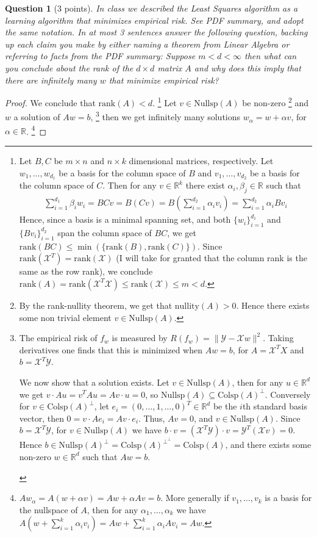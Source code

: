 \documentclass[12pt]{article}
\newcommand{\real}{\mathbb{R}}
\newcommand\set[1]{\{#1\}}
\newcommand\nullity{\text{nullity}}
\newcommand{\norm}[1]{\lVert #1 \rVert}
\newcommand{\X}{\mathcal{X}}
\newcommand{\Y}{\mathcal{Y}}
\newcommand{\colsp}{\text{Colsp}}
\newcommand{\nullsp}{\text{Nullsp}}
\newcommand{\rk}{\text{rank}}
\newtheorem{question}{Question}
\begin{document}
\begin{question}[3 points]
  In class we described the Least Squares algorithm as a learning algorithm that minimizes empirical risk.
  See PDF summary, and adopt the same notation. In at most 3 sentences answer the following question, backing up each claim you make by either naming a theorem from Linear Algebra or referring to facts from the PDF summary: Suppose $m < d < \infty$ then what can you conclude about the rank of the $d \times d$ matrix $A$ and why does this imply that there are infinitely many $w$ that minimize empirical risk? 
\end{question}
\begin{proof}

  We conclude that $\rk(A) < d$.
  \footnote{Let $B, C$ be $m \times n$ and $n \times k$ dimensional matrices, respectively. Let $w_1, \dots, w_{d_1}$ be a basis for the column space of $B$ and $v_1, \dots, v_{d_2}$ be a basis for the column space of $C$. Then for any $v \in \real^k$ there exist $\alpha_i, \beta_j \in \real$ such that
  \begin{align*}
   \sum\limits_{i=1}^{d_1}\beta_iw_i = BCv = B(Cv) =  B(\sum\limits_{i=1}^{d_2}\alpha_iv_i) = \sum\limits_{i=1}^{d_2}\alpha_iBv_i 
  \end{align*}
  Hence, since a basis is a minimal spanning set, and both $\set{w_i}_{i=1}^{d_1}$ and $\set{Bv_i}_{i=1}^{d_2}$  span the column space of $BC$, we get $\rk(BC) \leq \min(\set{\rk(B), \rk(C)})$. Since $\rk(\X^T) = \rk(\X)$ (I will take for granted that the column rank is the same as the row rank), we conclude $\rk(A) = \rk(\X^T\X) \leq \rk(\X) \leq m < d$.
  }
  Let $v \in \nullsp(A)$ be non-zero
  \footnote{
  By the rank-nullity theorem, we get that $\nullity(A)>0$. Hence there exists some non trivial element $ v \in \nullsp(A)$.
  }
  and $w$ a solution of $Aw=b$,
  \footnote{
  The empirical risk of $f_w$ is measured by $R(f_w) = \norm{\Y - \X w}^2$. Taking derivatives one finds that this is minimized when $Aw=b$, for $A=\X^T X$ and $b=\X^T \Y$. \\
  \begin{indent}
    We now show that a solution exists. Let $v \in \nullsp(A)$, then for any $u \in \real^d$ we get $v \cdot Au = v^T A u = Av \cdot u = 0$, so $\nullsp(A) \subseteq \colsp(A)^{\perp}$. Conversely for $v \in \colsp(A)^{\perp}$, let $e_i =(0, \dots, 1, \dots, 0)^T \in \real^d$ be the $i$th standard basis vector, then $0 = v \cdot Ae_i = Av \cdot e_i$. Thus, $Av = 0$, and $v \in \nullsp(A)$. Since $b=\X^T\Y$, for $v \in \nullsp(A)$ we have $b \cdot v = (\X^T \Y) \cdot v = \Y^T (\X v) = 0$. Hence $b \in \nullsp(A)^{\perp} = \colsp(A)^{\perp^\perp} = \colsp(A)$, and there exists some non-zero $w \in \real^d$ such that $Aw = b$.
  \end{indent}
  }
  then we get infinitely many solutions $w_{\alpha} = w + \alpha v$, for $\alpha \in \real$.
  \footnote{
  $Aw_{\alpha} = A(w + \alpha v) = Aw + \alpha Av = b$. More generally if $v_1, \dots, v_k$ is a basis for the nullspace of $A$, then for any $\alpha_1, \dots, \alpha_k$ we have
  $A(w+\sum\limits_{i=1}^k \alpha_iv_i) = Aw + \sum\limits_{i=1}^k \alpha_i Av_i = Aw$.
  }
\end{proof}
\end{document}
